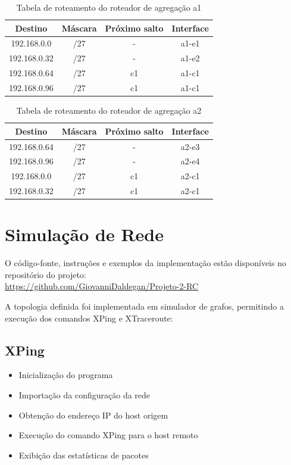 \documentclass[conference,compsoc]{IEEEtran}
\begin{document}
\begin{otherlanguage}{brazil}
\begin{table}[h]
\centering
\small
\begin{tabular}{|c|c|c|c|}
\hline
Destino & Máscara & Próximo salto & Interface \\
\hline
192.168.0.0 & /27 & - & a1-e1 \\
192.168.0.32 & /27 & - & a1-e2 \\
192.168.0.64 & /27 & c1 & a1-c1 \\
192.168.0.96 & /27 & c1 & a1-c1 \\
\hline
\end{tabular}
\caption{Tabela de roteamento do roteador de agregação a1}
\end{table}

\begin{table}[h]
\centering
\small
\begin{tabular}{|c|c|c|c|}
\hline
Destino & Máscara & Próximo salto & Interface \\
\hline
192.168.0.64 & /27 & - & a2-e3 \\
192.168.0.96 & /27 & - & a2-e4 \\
192.168.0.0 & /27 & c1 & a2-c1 \\
192.168.0.32 & /27 & c1 & a2-c1 \\
\hline
\end{tabular}
\caption{Tabela de roteamento do roteador de agregação a2}
\end{table}

\section{Simulação de Rede}

O código-fonte, instruções e exemplos da implementação estão disponíveis no repositório do projeto: \\ 
\url{https://github.com/GiovanniDaldegan/Projeto-2-RC}

A topologia definida foi implementada em simulador de grafos, permitindo a execução dos comandos XPing e XTraceroute:

\subsection{XPing}
\begin{itemize}
    \item Inicialização do programa
    \item Importação da configuração da rede
    \item Obtenção do endereço IP do host origem
    \item Execução do comando XPing para o host remoto
    \item Exibição das estatísticas de pacotes
\end{itemize}


\end{otherlanguage}
\end{document}

